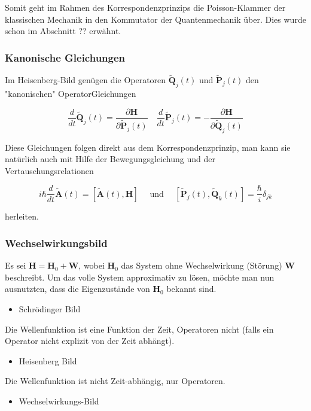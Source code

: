 \documentclass[10pt, letterpaper]{article}
\begin{document}
Somit geht im Rahmen des Korrespondenzprinzips die Poisson-Klammer der klassischen Mechanik in den Kommutator der Quantenmechanik über. Dies wurde schon im Abschnitt ?? erwähnt.

\subsubsection*{Kanonische Gleichungen}
Im Heisenberg-Bild genügen die Operatoren $\tilde{\mathbf{Q}}_{j}(t)$ und $\tilde{\mathbf{P}}_{j}(t)$ den "kanonischen" OperatorGleichungen

$$
\frac{d}{d t} \tilde{\mathbf{Q}}_{j}(t)=\frac{\partial \mathbf{H}}{\partial \tilde{\mathbf{P}}_{j}(t)} \quad \frac{d}{d t} \tilde{\mathbf{P}}_{j}(t)=-\frac{\partial \mathbf{H}}{\partial \tilde{\mathbf{Q}}_{j}(t)}
$$

Diese Gleichungen folgen direkt aus dem Korrespondenzprinzip, man kann sie natürlich auch mit Hilfe der Bewegungsgleichung und der Vertauschungsrelationen

$$
i \hbar \frac{d}{d t} \tilde{\mathbf{A}}(t)=[\tilde{\mathbf{A}}(t), \mathbf{H}] \quad \text { und } \quad\left[\tilde{\mathbf{P}}_{j}(t), \tilde{\mathbf{Q}}_{k}(t)\right]=\frac{\hbar}{i} \delta_{j k}
$$

herleiten.

\subsubsection*{Wechselwirkungsbild}
Es sei $\mathbf{H}=\mathbf{H}_{0}+\mathbf{W}$, wobei $\mathbf{H}_{0}$ das System ohne Wechselwirkung (Störung) $\mathbf{W}$ beschreibt. Um das volle System approximativ zu lösen, möchte man nun ausnutzten, dass die Eigenzustände von $\mathbf{H}_{0}$ bekannt sind.

\begin{itemize}
  \item Schrödinger Bild
\end{itemize}

Die Wellenfunktion ist eine Funktion der Zeit, Operatoren nicht (falls ein Operator nicht explizit von der Zeit abhängt).

\begin{itemize}
  \item Heisenberg Bild
\end{itemize}

Die Wellenfunktion ist nicht Zeit-abhängig, nur Operatoren.

\begin{itemize}
  \item Wechselwirkungs-Bild
\end{itemize}
\end{document}
